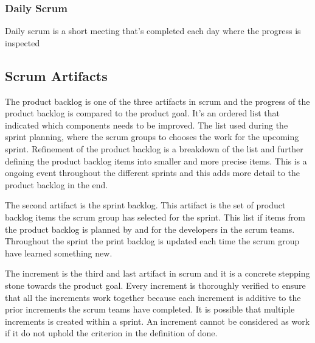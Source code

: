 \subsubsection{Daily Scrum}
Daily scrum is a short meeting that's completed each day where the progress is inspected 


\subsection{Scrum Artifacts}
The product backlog is one of the three artifacts in scrum and the progress of the product backlog is compared to the product goal.
It's an ordered list that indicated which components needs to be improved.
The list used during the sprint planning, where the scrum groups to chooses the work for the upcoming sprint.
Refinement of the product backlog is a breakdown of the list and further defining the product backlog items into smaller and more precise items.
This is a ongoing event throughout the different sprints and this adds more detail to the product backlog in the end. \cite{schwaber_sutherland_2022}
\newline

The second artifact is the sprint backlog. 
This artifact is the set of product backlog items the scrum group has selected for the sprint. 
This list if items from the product backlog is planned by and for the developers in the scrum teams. 
Throughout the sprint the print backlog is updated each time the scrum group have learned something new. \cite{schwaber_sutherland_2022}
\newline

The increment is the third and last artifact in scrum and it is a concrete stepping stone towards the product goal.
Every increment is thoroughly verified to ensure that all the increments work together because each increment is additive to the prior increments the scrum teams have completed.
It is possible that multiple increments is created within a sprint.
An increment cannot be considered as work if it do not uphold the criterion in the definition of done. \cite{schwaber_sutherland_2022}


